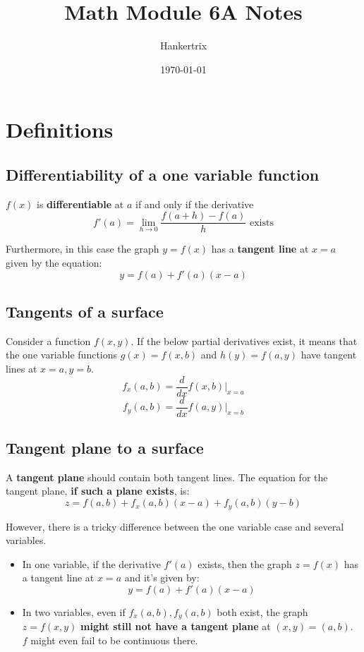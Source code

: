 \documentclass[11pt]{article}
\author{Hankertrix}
\date{\today}
\title{Math Module 6A Notes}
\begin{document}
\maketitle
\setcounter{tocdepth}{2}
\tableofcontents \clearpage\section{Definitions}
\label{sec:orga5f4149}

\subsection{Differentiability of a one variable function}
\label{sec:orgee56e35}
\(f(x)\) is \textbf{differentiable} at \(a\) if and only if the derivative
\[f'(a) = \lim_{h \rightarrow 0} \frac{f(a + h) - f(a)}{h} \text{ exists}\]

Furthermore, in this case the graph \(y = f(x)\) has a \textbf{tangent line} at \(x = a\) given by the equation:
\[y = f(a) + f'(a) (x - a)\]
\subsection{Tangents of a surface}
\label{sec:org43dc3d6}
Consider a function \(f(x, y)\). If the below partial derivatives exist, it means that the one variable functions \(g(x) = f(x, b)\) and \(h(y) = f(a, y)\) have tangent lines at \(x = a, y = b\).
\[f_x(a, b) = \frac{d}{dx}f(x, b)|_{x = a}\]
\[f_y(a, b) = \frac{d}{dx}f(a, y)|_{x = b}\]
\subsection{Tangent plane to a surface}
\label{sec:org9f82b5f}
A \textbf{tangent plane} should contain both tangent lines. The equation for the tangent plane, \textbf{if such a plane exists}, is:
\[z = f(a, b) + f_x (a, b)(x - a) + f_y(a, b)(y - b)\]

However, there is a tricky difference between the one variable case and several variables.
\begin{itemize}
\item In one variable, if the derivative \(f'(a)\) exists, then the graph \(z = f(x)\) has a tangent line at \(x = a\) and it's given by:
\[y = f(a) + f'(a) (x - a)\]
\item In two variables, even if \(f_x(a, b), f_y(a, b)\) both exist, the graph \(z = f(x, y)\) \textbf{might still not have a tangent plane} at \((x, y) = (a, b)\). \(f\) might even fail to be continuous there.
\end{itemize}
\end{document}

